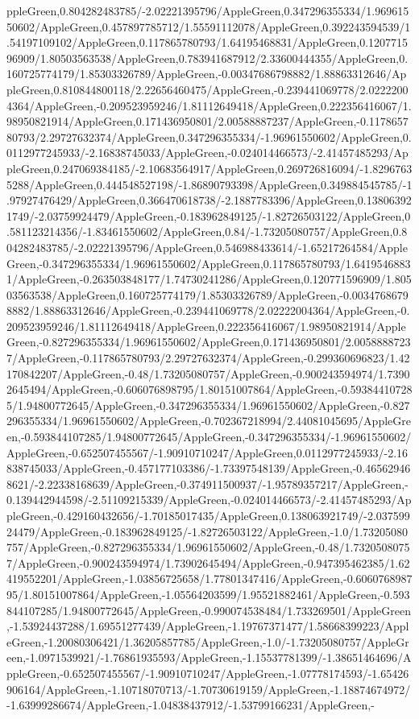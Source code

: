 {\begin{tikzternal}
ppleGreen,0.804282483785/-2.02221395796/AppleGreen,0.347296355334/1.96961550602/AppleGreen,0.457897785712/1.55591112078/AppleGreen,0.392243594539/1.54197109102/AppleGreen,0.117865780793/1.64195468831/AppleGreen,0.120771596909/1.80503563538/AppleGreen,0.783941687912/2.33600444355/AppleGreen,0.160725774179/1.85303326789/AppleGreen,-0.00347686798882/1.88863312646/AppleGreen,0.810844800118/2.22656460475/AppleGreen,-0.239441069778/2.02222004364/AppleGreen,-0.209523959246/1.81112649418/AppleGreen,0.222356416067/1.98950821914/AppleGreen,0.171436950801/2.00588887237/AppleGreen,-0.117865780793/2.29727632374/AppleGreen,0.347296355334/-1.96961550602/AppleGreen,0.0112977245933/-2.16838745033/AppleGreen,-0.024014466573/-2.41457485293/AppleGreen,0.247069384185/-2.10683564917/AppleGreen,0.269726816094/-1.82967635288/AppleGreen,0.444548527198/-1.86890793398/AppleGreen,0.349884545785/-1.97927476429/AppleGreen,0.366470618738/-2.1887783396/AppleGreen,0.138063921749/-2.03759924479/AppleGreen,-0.183962849125/-1.82726503122/AppleGreen,0.581123214356/-1.83461550602/AppleGreen,0.84/-1.73205080757/AppleGreen,0.804282483785/-2.02221395796/AppleGreen,0.546988433614/-1.65217264584/AppleGreen,-0.347296355334/1.96961550602/AppleGreen,0.117865780793/1.64195468831/AppleGreen,-0.263503848177/1.74730241286/AppleGreen,0.120771596909/1.80503563538/AppleGreen,0.160725774179/1.85303326789/AppleGreen,-0.00347686798882/1.88863312646/AppleGreen,-0.239441069778/2.02222004364/AppleGreen,-0.209523959246/1.81112649418/AppleGreen,0.222356416067/1.98950821914/AppleGreen,-0.827296355334/1.96961550602/AppleGreen,0.171436950801/2.00588887237/AppleGreen,-0.117865780793/2.29727632374/AppleGreen,-0.299360696823/1.42170842207/AppleGreen,-0.48/1.73205080757/AppleGreen,-0.900243594974/1.73902645494/AppleGreen,-0.606076898795/1.80151007864/AppleGreen,-0.593844107285/1.94800772645/AppleGreen,-0.347296355334/1.96961550602/AppleGreen,-0.827296355334/1.96961550602/AppleGreen,-0.702367218994/2.44081045695/AppleGreen,-0.593844107285/1.94800772645/AppleGreen,-0.347296355334/-1.96961550602/AppleGreen,-0.652507455567/-1.90910710247/AppleGreen,0.0112977245933/-2.16838745033/AppleGreen,-0.457177103386/-1.73397548139/AppleGreen,-0.465629468621/-2.22338168639/AppleGreen,-0.374911500937/-1.95789357217/AppleGreen,-0.139442944598/-2.51109215339/AppleGreen,-0.024014466573/-2.41457485293/AppleGreen,-0.429160432656/-1.70185017435/AppleGreen,0.138063921749/-2.03759924479/AppleGreen,-0.183962849125/-1.82726503122/AppleGreen,-1.0/1.73205080757/AppleGreen,-0.827296355334/1.96961550602/AppleGreen,-0.48/1.73205080757/AppleGreen,-0.900243594974/1.73902645494/AppleGreen,-0.947395462385/1.62419552201/AppleGreen,-1.03856725658/1.77801347416/AppleGreen,-0.606076898795/1.80151007864/AppleGreen,-1.05564203599/1.95521882461/AppleGreen,-0.593844107285/1.94800772645/AppleGreen,-0.990074538484/1.733269501/AppleGreen,-1.53924437288/1.69551277439/AppleGreen,-1.19767371477/1.58668399223/AppleGreen,-1.20080306421/1.36205857785/AppleGreen,-1.0/-1.73205080757/AppleGreen,-1.0971539921/-1.76861935593/AppleGreen,-1.15537781399/-1.38651464696/AppleGreen,-0.652507455567/-1.90910710247/AppleGreen,-1.07778174593/-1.65426906164/AppleGreen,-1.10718070713/-1.70730619159/AppleGreen,-1.18874674972/-1.63999286674/AppleGreen,-1.04838437912/-1.53799166231/AppleGreen,-
\end{tikzternal}}
